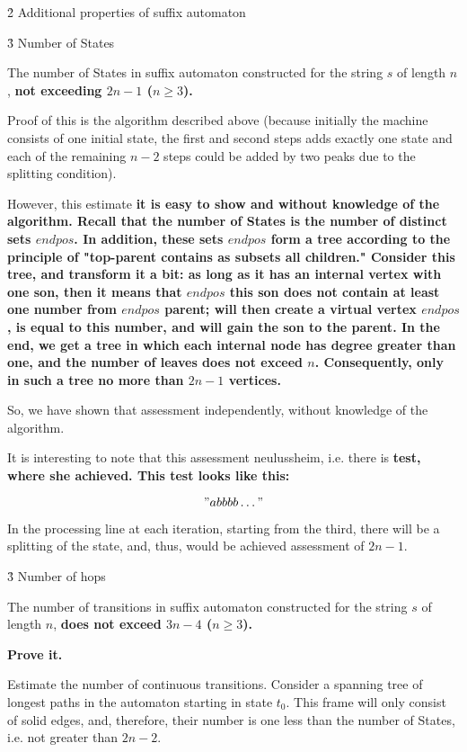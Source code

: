 \h2{ Additional properties of suffix automaton }


\h3{ Number of States }

The number of States in suffix automaton constructed for the string $s$ of length $n$, \bf{not exceeding $2n-1$} ($n \ge 3$).

Proof of this is the algorithm described above (because initially the machine consists of one initial state, the first and second steps adds exactly one state and each of the remaining $n-2$ steps could be added by two peaks due to the splitting condition).

However, this estimate \bf{it is easy to show and without knowledge of the algorithm}. Recall that the number of States is the number of distinct sets $endpos$. In addition, these sets $endpos$ form a tree according to the principle of "top-parent contains as subsets all children." Consider this tree, and transform it a bit: as long as it has an internal vertex with one son, then it means that $endpos$ this son does not contain at least one number from $endpos$ parent; will then create a virtual vertex $endpos$, is equal to this number, and will gain the son to the parent. In the end, we get a tree in which each internal node has degree greater than one, and the number of leaves does not exceed $n$. Consequently, only in such a tree no more than $2n-1$ vertices.

So, we have shown that assessment independently, without knowledge of the algorithm.

It is interesting to note that this assessment neulussheim, i.e. there is \bf{test, where she achieved}. This test looks like this:

$$ "abbbb \ldots" $$

In the processing line at each iteration, starting from the third, there will be a splitting of the state, and, thus, would be achieved assessment of $2n-1$.


\h3{ Number of hops }

The number of transitions in suffix automaton constructed for the string $s$ of length $n$, \bf{does not exceed $3n-4$} ($n \ge 3$).

\bf{Prove} it.

Estimate the number of continuous transitions. Consider a spanning tree of longest paths in the automaton starting in state $t_0$. This frame will only consist of solid edges, and, therefore, their number is one less than the number of States, i.e. not greater than $2n-2$.

